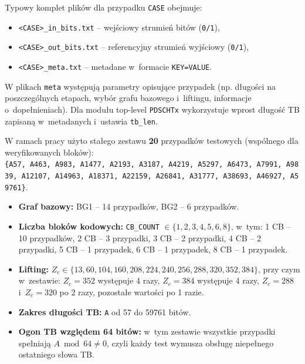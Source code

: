 Typowy komplet plików dla przypadku \texttt{CASE} obejmuje:
\begin{itemize}
    \item \texttt{<CASE>\_in\_bits.txt} -- wejściowy strumień bitów (\texttt{0/1}),
    \item \texttt{<CASE>\_out\_bits.txt} -- referencyjny strumień wyjściowy (\texttt{0/1}),
    \item \texttt{<CASE>\_meta.txt} -- metadane w~formacie \texttt{KEY=VALUE}.
\end{itemize}

W plikach \texttt{meta} występują parametry opisujące przypadek (np. długości na poszczególnych etapach,
wybór grafu bazowego i~liftingu, informacje o~dopełnieniach). Dla modułu top-level \texttt{PDSCHTx}
 wykorzystuje wprost długość TB zapisaną w~metadanych i~ustawia \texttt{tb\_len}.

W ramach pracy użyto stałego zestawu \textbf{20} przypadków testowych (wspólnego dla weryfikowanych bloków):
\texttt{\{A57,\allowbreak\ A463,\allowbreak\ A983,\allowbreak\ A1477,\allowbreak\ A2193,\allowbreak\ A3187,\allowbreak\ A4219,\allowbreak\ A5297,\allowbreak\ A6473,\allowbreak\ A7991,\allowbreak\ A9839,\allowbreak\ A12107,\allowbreak\ A14963,\allowbreak\ A18371,\allowbreak\ A22159,\allowbreak\ A26841,\allowbreak\ A31777,\allowbreak\ A38693,\allowbreak\ A46927,\allowbreak\ A59761\}}.

\begin{itemize}
    \item \textbf{Graf bazowy:} BG1 -- 14 przypadków, BG2 -- 6 przypadków.
    \item \textbf{Liczba bloków kodowych:} \texttt{CB\_COUNT} $\in \{1,2,3,4,5,6,8\}$, w~tym:
          1 CB -- 10 przypadków, 2 CB -- 3 przypadki, 3 CB -- 2 przypadki, 4 CB -- 2 przypadki,
          5 CB -- 1 przypadek, 6 CB -- 1 przypadek, 8 CB -- 1 przypadek.
    \item \textbf{Lifting:} $Z_c \in \{13,60,104,160,208,224,240,256,288,320,352,384\}$, przy czym w~zestawie:
          $Z_c=352$ występuje 4 razy, $Z_c=384$ występuje 4 razy, $Z_c=288$ i~$Z_c=320$ po 2 razy,
          pozostałe wartości po 1 razie.
    \item \textbf{Zakres długości TB:} \texttt{A} od 57 do 59761 bitów.
    \item \textbf{Ogon TB względem 64 bitów:} w~tym zestawie wszystkie przypadki spełniają $A \bmod 64 \neq 0$,
          czyli każdy test wymusza obsługę niepełnego ostatniego słowa TB.
\end{itemize}


